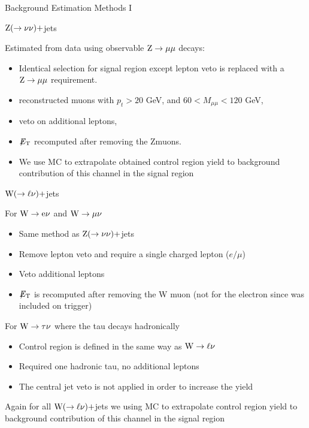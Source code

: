 \documentclass[8pt]{beamer}
\newcommand\Fontvi{\fontsize{6}{7.2}\selectfont}
\newcommand{\met}{\displaystyle{\not} E_{\rm T}}
\newcommand{\W}{{\rm W}}
\newcommand{\Z}{{\rm Z}}
\begin{document}
\begin{frame}{Background Estimation Methods I}
\Fontvi 
 
\begin{block}{$\Z (\rightarrow \nu \nu)+$jets}

Estimated from data using observable $\Z \rightarrow \mu \mu$ decays:

\begin{itemize}
 \item Identical selection for signal region except lepton veto is replaced with a $\Z \rightarrow \mu \mu$ requirement.
 \item reconstructed muons with $p_t > 20 $ GeV, and $60 < M_{\mu\mu}<120$ GeV, 
 \item veto on additional leptons, 
 \item $\met$ recomputed after removing the \Z muons.  
 \item We use MC to extrapolate obtained control region yield to background contribution of this channel in the signal region
\end{itemize}

\end{block}
 
\begin{block}{$\W (\rightarrow \ell \nu)+$jets}

For $\W \rightarrow {\rm e} \nu$ and $\W \rightarrow \mu \nu$ 
\begin{itemize}
 \item Same method as $\Z (\rightarrow \nu \nu)+$jets
 \item Remove lepton veto and require a single charged lepton ($e/\mu$)
 \item Veto additional leptons
 \item $\met$ is recomputed after removing the W muon (not for the electron since was included on trigger)
\end{itemize}

For $\W \rightarrow \tau\nu$ where the tau decays hadronically
\begin{itemize}
 \item Control region is defined in the same way as $\W \rightarrow \ell \nu$
 \item Required one hadronic tau, no additional leptons
 \item The central jet veto is not applied in order to increase the yield
\end{itemize}

Again for all $\W (\rightarrow \ell \nu)+$jets we using MC to extrapolate control region yield to background contribution of this channel in the signal region

\end{block} 
 
\end{frame}
\end{document}
